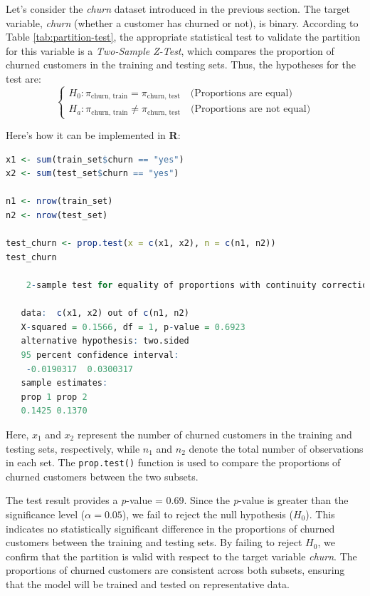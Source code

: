 \documentclass[
]{book}
\newcommand{\passthrough}[1]{#1}
\theoremstyle{definition}
\theoremstyle{definition}
\theoremstyle{definition}
\theoremstyle{definition}
\theoremstyle{remark}
\begin{document}
Let's consider the \emph{churn} dataset introduced in the previous section. The target variable, \emph{churn} (whether a customer has churned or not), is binary. According to Table \ref{tab:partition-test}, the appropriate statistical test to validate the partition for this variable is a \emph{Two-Sample Z-Test}, which compares the proportion of churned customers in the training and testing sets. Thus, the hypotheses for the test are:\\
\[
\begin{cases}
H_0:  \pi_{\text{churn, train}} = \pi_{\text{churn, test}} \quad \text{(Proportions are equal)} \\
H_a:  \pi_{\text{churn, train}} \neq \pi_{\text{churn, test}} \quad \text{(Proportions are not equal)}
\end{cases}
\]

Here's how it can be implemented in \textbf{R}:

\begin{lstlisting}[language=R]
x1 <- sum(train_set$churn == "yes")
x2 <- sum(test_set$churn == "yes")

n1 <- nrow(train_set)
n2 <- nrow(test_set)

test_churn <- prop.test(x = c(x1, x2), n = c(n1, n2))
test_churn
   
    2-sample test for equality of proportions with continuity correction
   
   data:  c(x1, x2) out of c(n1, n2)
   X-squared = 0.1566, df = 1, p-value = 0.6923
   alternative hypothesis: two.sided
   95 percent confidence interval:
    -0.0190317  0.0300317
   sample estimates:
   prop 1 prop 2 
   0.1425 0.1370
\end{lstlisting}

Here, \(x_1\) and \(x_2\) represent the number of churned customers in the training and testing sets, respectively, while \(n_1\) and \(n_2\) denote the total number of observations in each set. The \passthrough{\lstinline!prop.test()!} function is used to compare the proportions of churned customers between the two subsets.

The test result provides a \emph{p}-value = 0.69. Since the \emph{p}-value is greater than the significance level (\(\alpha = 0.05\)), we fail to reject the null hypothesis (\(H_0\)). This indicates no statistically significant difference in the proportions of churned customers between the training and testing sets. By failing to reject \(H_0\), we confirm that the partition is valid with respect to the target variable \emph{churn}. The proportions of churned customers are consistent across both subsets, ensuring that the model will be trained and tested on representative data.
\end{document}

